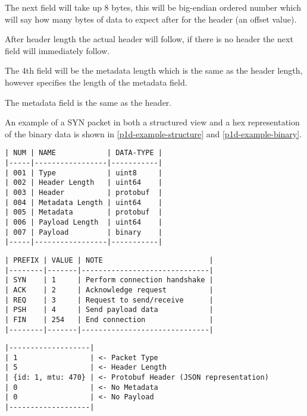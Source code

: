 The next field will take up 8 bytes, this will be big-endian ordered number which will say how many bytes of data to expect after for the header (an offset value).

After header length the actual header will follow, if there is no header the next field will immediately follow.

The 4th field will be the metadata length which is the same as the header length, however specifies the length of the metadata field.

The metadata field is the same as the header.

An example of a SYN packet in both a structured view and a hex representation of the binary data is shown in \ref{p1d-example-structure} and \ref{p1d-example-binary}.

\FloatBarrier

\begin{lstlisting}[float,caption={Prototype One Packet Fields},label=p1d-packet-fields]
| NUM | NAME            | DATA-TYPE |
|-----|-----------------|-----------|
| 001 | Type            | uint8     |
| 002 | Header Length   | uint64    |
| 003 | Header          | protobuf  |
| 004 | Metadata Length | uint64    |
| 005 | Metadata        | protobuf  |
| 006 | Payload Length  | uint64    |
| 007 | Payload         | binary    |
|-----|-----------------|-----------|
\end{lstlisting}

\begin{lstlisting}[float,caption={Prototype One Packet Types},label=p1d-packet-types]
| PREFIX | VALUE | NOTE                         |
|--------|-------|------------------------------|
| SYN    | 1     | Perform connection handshake |
| ACK    | 2     | Acknowledge request          |
| REQ    | 3     | Request to send/receive      |
| PSH    | 4     | Send payload data            |
| FIN    | 254   | End connection               |
|--------|-------|------------------------------|
\end{lstlisting}

\begin{lstlisting}[float,caption={Prototype One Example Packet Structure},label=p1d-example-structure]
|-------------------|
| 1                 | <- Packet Type
| 5                 | <- Header Length
| {id: 1, mtu: 470} | <- Protobuf Header (JSON representation)
| 0                 | <- No Metadata
| 0                 | <- No Payload
|-------------------|
\end{lstlisting}

